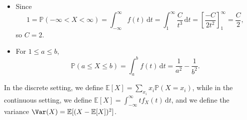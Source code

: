 \begin{explanation}
\hfill
    \begin{itemize}
        \item [(a)] Since 
        \[
            1 = \mathbb{P} (-\infty < X < \infty) = \int _{-\infty }^{\infty } f(t) \, \mathrm{d} t = \int _1^{\infty} \frac{C}{t^3} \, \mathrm{d} t = \left[ \frac{-C}{2t^2} \right]_1^{\infty} = \frac{C}{2},  
        \]
        so \(C = 2\). 
        \item [(b)] For \(1 \le a \le b\), 
        \[
            \mathbb{P} (a \le X \le b) = \int _a^b f(t) \, \mathrm{d} t = \frac{1}{a^2} - \frac{1}{b^2}. 
        \]
    \end{itemize}
\end{explanation}

\begin{definition}
    In the discrete setting, we define \(\mathbb{E} [X] = \sum_{x_i} x_i \mathbb{P} (X = x_i) \), while in the continuous setting, we define \(\mathbb{E} [X] = \int _{-\infty }^{\infty} t f_X(t) \, \mathrm{d} t \), and we define the variance \(\Var(X) = \mathbb{E} [(X - \mathbb{E} [X])^2]\). 
\end{definition}

